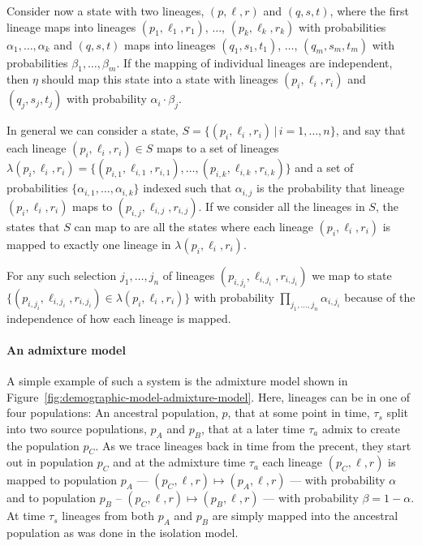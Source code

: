 Consider now a state with two lineages, $(p,\ell,r)$ and $(q,s,t)$, where the first lineage maps into lineages $(p_1,\ell_1,r_1)$, $\ldots$, $(p_k,\ell_k,r_k)$ with probabilities $\alpha_1, \ldots, \alpha_k$ and $(q,s,t)$ maps into lineages $(q_1,s_1,t_1)$, $\ldots$, $(q_m,s_m,t_m)$ with probabilities $\beta_1,\ldots,\beta_m$. If the mapping of individual lineages are independent, then $\eta$ should map this state into a state with lineages $(p_i,\ell_i,r_i)$ and $(q_j,s_j,t_j)$ with probability $\alpha_i\cdot\beta_j$.

In general we can consider a state, $S=\{(p_i,\ell_i,r_i)\,|\,i=1,\ldots,n\}$, and say that  each lineage $(p_i,\ell_i,r_i)\in S$ maps to a set of lineages $\lambda(p_i,\ell_i,r_i)=\{(p_{i,1},\ell_{i,1},r_{i,1}),\ldots,(p_{i,k},\ell_{i,k},r_{i,k})\}$ and a set of probabilities $\{\alpha_{i,1},\ldots,\alpha_{i,k}\}$ indexed such that $\alpha_{i,j}$ is the probability that lineage $(p_i,\ell_i,r_i)$ maps to $(p_{i,j},\ell_{i,j},r_{i,j})$. If we consider all the lineages in $S$, the states that $S$ can map to are all the states where each lineage $(p_i,\ell_i,r_i)$ is mapped to exactly one lineage in $\lambda(p_i,\ell_i,r_i)$.

For any such selection $j_1,\ldots,j_n$ of lineages $(p_{i,j_i},\ell_{i,j_i},r_{i,j_i})$ we map to state $\{ (p_{i,j_i},\ell_{i,j_i},r_{i,j_i})\in\lambda(p_i,\ell_i,r_i) \}$ with probability $\prod_{j_1,\ldots,j_n} \alpha_{i,j_i}$ because of the independence of how each lineage is mapped.


\paragraph{An admixture model}

A simple example of such a system is the admixture model shown in Figure~\ref{fig:demographic-model-admixture-model}. Here, lineages can be in one of four populations: An ancestral population, $p$, that at some point in time, $\tau_s$ split into two source populations, $p_A$ and $p_B$, that at a later time $\tau_a$ admix to create the population $p_C$. As we trace lineages back in time from the precent, they start out in population $p_C$ and at the admixture time $\tau_a$ each lineage $(p_C,\ell,r)$ is mapped to population $p_A$ --- $(p_C,\ell,r)\mapsto(p_A,\ell,r)$ --- with probability $\alpha$ and to population $p_B$ -- $(p_C,\ell,r)\mapsto(p_B,\ell,r)$ --- with probability $\beta=1-\alpha$. At time $\tau_s$ lineages from both $p_A$ and $p_B$ are simply mapped into the ancestral population as was done in the isolation model.


